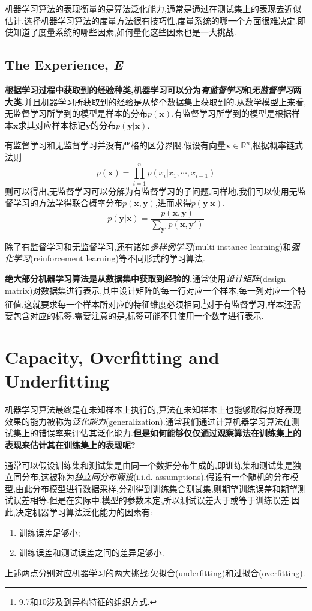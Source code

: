 机器学习算法的表现衡量的是算法泛化能力,通常是通过在测试集上的表现去近似估计.选择机器学习算法的度量方法很有技巧性,度量系统的哪一个方面很难决定.即使知道了度量系统的哪些因素,如何量化这些因素也是一大挑战.

\subsection{The Experience, \textit E}

\textbf{根据学习过程中获取到的经验种类,机器学习可以分为\textit{有监督学习}和\textit{无监督学习}两大类.}并且机器学习所获取到的经验是从整个数据集上获取到的.从数学模型上来看,无监督学习所学到的模型是样本的分布$p(\bm x)$,有监督学习所学到的模型是根据样本$\bm x$求其对应样本标记$\bm y$的分布$p(\bm y|\bm x)$.

有监督学习和无监督学习并没有严格的区分界限.假设有向量$\bm x\in\mathbb R^n$,根据概率链式法则
\begin{equation}
p(\bm x)=\prod_{i=1}^np(x_i|x_1,\cdots,x_{i-1})
\end{equation}
则可以得出,无监督学习可以分解为有监督学习的子问题.同样地,我们可以使用无监督学习的方法学得联合概率分布$p(\bm x, \bm y)$,进而求得$p(\bm y|\bm x)$.
\begin{equation}
p(\bm y|\bm x)=\frac{p(\bm{x,y})}{\sum_{\bm y'}p(\bm x,\bm y')}
\end{equation}

除了有监督学习和无监督学习,还有诸如\textit{多样例学习}(multi-instance learning)和\textit{强化学习}(reinforcement learning)等不同形式的学习算法.

\textbf{绝大部分机器学习算法是从数据集中获取到经验的.}通常使用\textit{设计矩阵}(design matrix)对数据集进行表示,其中设计矩阵的每一行对应一个样本,每一列对应一个特征值.这就要求每一个样本所对应的特征维度必须相同.\footnote{9.7和10涉及到异构特征的组织方式.}对于有监督学习,样本还需要包含对应的标签.需要注意的是,标签可能不只使用一个数字进行表示.

\section{Capacity, Overfitting and Underfitting}

机器学习算法最终是在未知样本上执行的,算法在未知样本上也能够取得良好表现效果的能力被称为\textit{泛化能力}(generalization).通常我们通过计算机器学习算法在测试集上的错误率来评估其泛化能力.\textbf{但是如何能够仅仅通过观察算法在训练集上的表现来估计其在训练集上的表现呢?}

通常可以假设训练集和测试集是由同一个数据分布生成的,即训练集和测试集是独立同分布,这被称为\textit{独立同分布假设}(i.i.d. assumptions).假设有一个随机的分布模型,由此分布模型进行数据采样,分别得到训练集合测试集,则期望训练误差和期望测试误差相等.但是在实际中,模型的参数未定,所以测试误差大于或等于训练误差.因此,决定机器学习算法泛化能力的因素有:
\begin{enumerate}
\item 训练误差足够小;
\item 训练误差和测试误差之间的差异足够小.
\end{enumerate}
上述两点分别对应机器学习的两大挑战:欠拟合(underfitting)和过拟合(overfitting).

